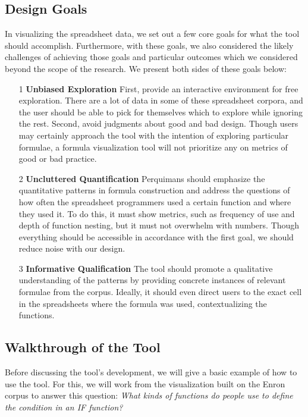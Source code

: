\documentclass[conference]{IEEEtran}
\newcommand{\toolname}{Perquimans\xspace} \newcommand{\toolnameend}{Perquimans}
\begin{document}
	\subsection{Design Goals} \label{goals} In visualizing the spreadsheet data, we
	set out a few core goals for what the tool should accomplish. Furthermore, with
	these goals, we also considered the likely challenges of achieving those goals
	and particular outcomes which we considered beyond the scope of the research.
	We present both sides of these goals below:
	
	\begin{itemize}
		
		\item [1] \textbf{Unbiased Exploration} First, provide an interactive
		environment for free exploration. There are a lot of data in some of these
		spreadsheet corpora, and the user should be able to pick for themselves which
		to explore while ignoring the rest. Second, avoid judgments about good and bad
		design. Though users may certainly approach the tool with the intention of
		exploring particular formulae, a formula visualization tool will not
		prioritize any on metrics of good or bad practice.
		
		\item [2] \textbf{Uncluttered Quantification} \toolname should emphasize the
		quantitative patterns in formula construction and address the questions of how
		often the spreadsheet programmers used a certain function and where they used
		it. To do this, it must show metrics, such as frequency of use and depth of
		function nesting, but it must not overwhelm with numbers. Though everything
		should be accessible in accordance with the first goal, we should reduce noise with our design.
		
		\item [3] \textbf{Informative Qualification} The tool should promote a qualitative understanding of the patterns by providing concrete instances of relevant
		formulae from the corpus. Ideally, it should even direct users to the exact
		cell in the spreadsheets where the formula was used, contextualizing the
		functions.
		
	\end{itemize}
	
	\subsection{Walkthrough of the Tool} \label{sec:walkthrough}Before discussing
	the tool's development, we will give a basic example of how to use
	the tool. For this, we will work from the visualization built on the Enron
	corpus to answer this question: \textit{ What kinds of functions do people use
		to define the condition in an IF function?} \par
	
\end{document}
